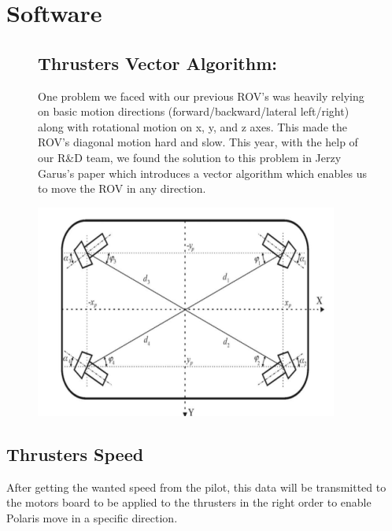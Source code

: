 \documentclass[a4paper,10pt]{article}
\begin{document}
	\section{Software}
	\setcounter{subsection}{0}
	\begin{figure}[H]
		\begin{minipage}{0.6\textwidth}
			\subsection{Thrusters Vector Algorithm:}
			One problem we faced with our previous ROV’s was heavily
			relying on basic motion directions (forward/backward/lateral left/right)
			along with rotational motion on x, y, and z axes. This made the ROV’s 
			diagonal motion hard and slow. This year, with the help of our R\&D
			team, we found the solution to this problem in Jerzy Garus’s paper
			which introduces a vector algorithm which enables us to move the
			ROV in any direction.
		\end{minipage}
		\hfill
		\begin{minipage}{0.35\textwidth}
			\centering
			\includegraphics[width=\textwidth]{vector_algorithm}
		\end{minipage}
	\end{figure}
	\subsection{Thrusters Speed}
		After getting the wanted speed from the pilot, this data will be transmitted to the motors board
		to be applied to the thrusters in the right order to enable Polaris move in a specific direction.  
		
\end{document}
